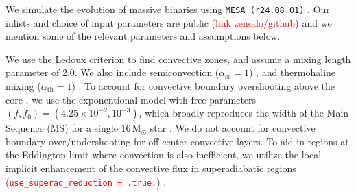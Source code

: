\documentclass[linenumbers,trackchanges,twocolumn]{aastex701}
\newcommand{\Mdot}{\mathrm{M}_{\odot}}
\newcommand{\red}{\textcolor{red}}
\begin{document}
We simulate the evolution of massive binaries using \texttt{MESA (r24.08.01)} \citep{2011ApJS..192....3P,2013ApJS..208....4P,2015ApJS..220...15P,2018ApJS..234...34P,2019ApJS..243...10P,2023ApJS..265...15J}. Our inlists and choice of input parameters are public (\red{link zenodo/github}) and we mention some of the relevant parameters and assumptions below.


We use the Ledoux criterion \citep{1947ApJ...105..305L} to find convective zones, and assume a mixing length parameter of 2.0. We also include semiconvection ($\alpha_{\mathrm{sc}}=1$) \citep{1983A&A...126..207L}, and thermohaline mixing ($\alpha_{\mathrm{th}}=1$) \citep{1980A&A....91..175K}. To account for convective boundary overshooting above the core \citep{2000A&A...360..952H,2018ApJ...859..100C}, we use the exponentional model with free parameters $(f,f_0) = (4.25 \times 10^{-2}, 10^{-3})$, which broadly reproduces the width of the Main Sequence (MS) for a single $16 \, \Mdot$ star \citep{2011A&A...530A.115B}. We do not account for convective boundary over/undershooting for off-center convective layers. To aid in regions at the Eddington limit where convection is also inefficient, we utilize the local implicit enhancement of the convective flux in superadiabatic regions (\texttt{\red{use\_superad\_reduction = .true.}}) \citep{2023ApJS..265...15J}.
\end{document}
